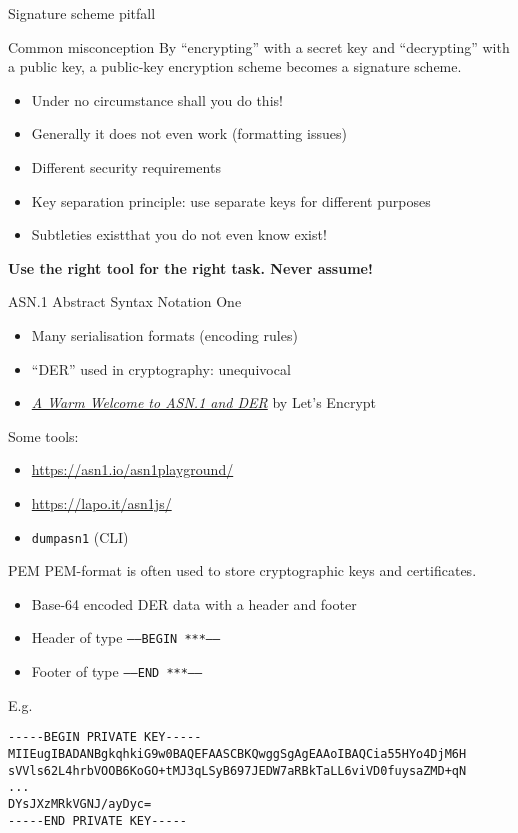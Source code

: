 \begin{frame}{Signature scheme pitfall}
  \pause
  \begin{block}{Common misconception}
    By \enquote{encrypting} with a secret key and \enquote{decrypting} with a public key, a public-key encryption scheme becomes a signature scheme.
  \end{block}

  \begin{itemize}[<+(1)->]
    \item Under no circumstance shall you do this!
    \item Generally it does not even work (formatting issues)
    \item Different security requirements
    \item Key separation principle: use separate keys for different purposes
    \item Subtleties existthat you do not even know exist!
  \end{itemize}

  \pause
  \textbf{Use the right tool for the right task. Never assume!}
\end{frame}

\begin{frame}{ASN.1}
  Abstract Syntax Notation One
  \begin{itemize}[<+(1)->]
    \item Many serialisation formats (encoding rules)
    \item \enquote{DER} used in cryptography: unequivocal
    \item \href{https://letsencrypt.org/docs/a-warm-welcome-to-asn1-and-der/}{\textit{A Warm Welcome to ASN.1 and DER}} by Let's Encrypt
  \end{itemize}

  \pause
  Some tools:
  \begin{itemize}[<+(1)->]
    \item \url{https://asn1.io/asn1playground/}
    \item \url{https://lapo.it/asn1js/}
    \item \texttt{dumpasn1} (CLI)
  \end{itemize}
\end{frame}

\begin{frame}[fragile]{PEM}
  PEM-format is often used to store cryptographic keys and certificates.
  \pause
  \begin{itemize}
    \item Base-64 encoded DER data with a header and footer
    \item Header of type \texttt{-----BEGIN ***-----}
    \item Footer of type \texttt{-----END ***-----}
  \end{itemize}

  \pause
  E.g.
  \begin{Verbatim}[fontsize=\scriptsize]
-----BEGIN PRIVATE KEY-----
MIIEugIBADANBgkqhkiG9w0BAQEFAASCBKQwggSgAgEAAoIBAQCia55HYo4DjM6H
sVVls62L4hrbVOOB6KoGO+tMJ3qLSyB697JEDW7aRBkTaLL6viVD0fuysaZMD+qN
...
DYsJXzMRkVGNJ/ayDyc=
-----END PRIVATE KEY-----
  \end{Verbatim}
\end{frame}


